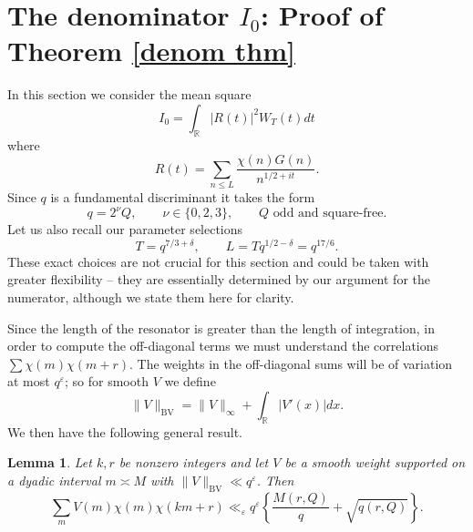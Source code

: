 \documentclass[12pt, oneside]{amsart}
\newtheorem{lem}[prop]{Lemma}
\theoremstyle{definition}
\newcommand{\mb}{\mathbb}
\newcommand{\leqs}{\leqslant }
\newcommand{\eps}{\varepsilon}
\newcommand{\1}{\mathds{1}}
\begin{document}
\section{The denominator $I_0$: Proof of Theorem \ref{denom thm}}

In this section we consider the mean square
\[
I_0=\int_\mb{R}|R(t)|^2W_T(t)dt
\]
where 
\[
R(t)=\sum_{n\leqs L}\frac{\chi(n)G(n)}{n^{1/2+it}}.
\]
Since $q$ is a fundamental discriminant it takes the form
\begin{equation}
 q=2^\nu Q,\qquad \nu\in\{0,2,3\},\qquad Q\text{ odd and square-free}.
 \label{eq:fundamental-q}
\end{equation}
Let us also recall our parameter selections
\[
 T=q^{7/3+\delta},\qquad
 L=Tq^{1/2-\delta}=q^{17/6}.
\]
These exact choices are not crucial for this section and could be taken with greater flexibility -- they are essentially determined by our argument for the numerator, although we state them here for clarity. 

Since the length of the resonator is greater than the length of integration, in order to compute the off-diagonal terms we must understand the correlations $\sum\chi(m)\chi(m+r)$. The weights in the off-diagonal sums will be of variation at most $q^\eps$; so for smooth $V$ we define
\[
\|V\|_{\mathrm{BV}}=\|V\|_\infty+\int_\mb{R}|V'(x)|dx.
\] 
We then have the following general result. 



\begin{lem}
\label{lem:completion}
Let $k,r$ be nonzero integers and let $V$ be a smooth weight supported on a dyadic
interval $m\asymp M$ with $\|V\|_{\mathrm{BV}}\ll q^{\eps}$.  Then
\begin{equation}
 \sum_mV(m)\chi(m)\chi(km+r)
 \ll_{\eps}q^{\eps}
 \left\{\frac{M(r,Q)}q+\sqrt{q(r,Q)}\right\}.
 \label{eq:completion}
\end{equation}
\end{lem}
\end{document}
